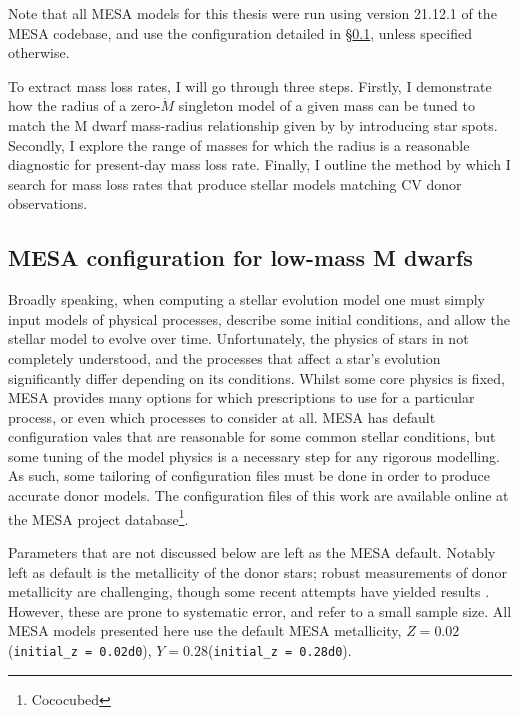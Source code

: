 Note that all MESA models for this thesis were run using version 21.12.1 of the MESA codebase, and use the configuration detailed in \S\ref{sect:modelling:MESA configs}, unless specified otherwise.

To extract mass loss rates, I will go through three steps.
Firstly, I demonstrate how the radius of a zero-$\dot M$ singleton model of a given mass can be tuned to match the M dwarf mass-radius relationship given by \citet{brown2022} by introducing star spots.
Secondly, I explore the range of masses for which the radius is a reasonable diagnostic for present-day mass loss rate.
Finally, I outline the method by which I search for mass loss rates that produce stellar models matching CV donor observations.


\subsection{MESA configuration for low-mass M dwarfs}
\label{sect:modelling:MESA configs}

Broadly speaking, when computing a stellar evolution model one must simply input models of physical processes, describe some initial conditions, and allow the stellar model to evolve over time. Unfortunately, the physics of stars in not completely understood, and the processes that affect a star's evolution significantly differ depending on its conditions.
Whilst some core physics is fixed, MESA provides many options for which prescriptions to use for a particular process, or even which processes to consider at all.
MESA has default configuration vales that are reasonable for some common stellar conditions, but some tuning of the model physics is a necessary step for any rigorous modelling.
As such, some tailoring of configuration files must be done in order to produce accurate donor models. The configuration files of this work are available online at the MESA project database\footnote{Cococubed}.

Parameters that are not discussed below are left as the MESA default.
Notably left as default is the metallicity of the donor stars; robust measurements of donor metallicity are challenging, though some recent attempts have yielded results \citep{harrison2016,harrison2018}. However, these are prone to systematic error, and refer to a small sample size. All MESA models presented here use the default MESA metallicity, $Z = 0.02$ (\lstinline{initial_z = 0.02d0}), $Y = 0.28$(\lstinline{initial_z = 0.28d0}).


